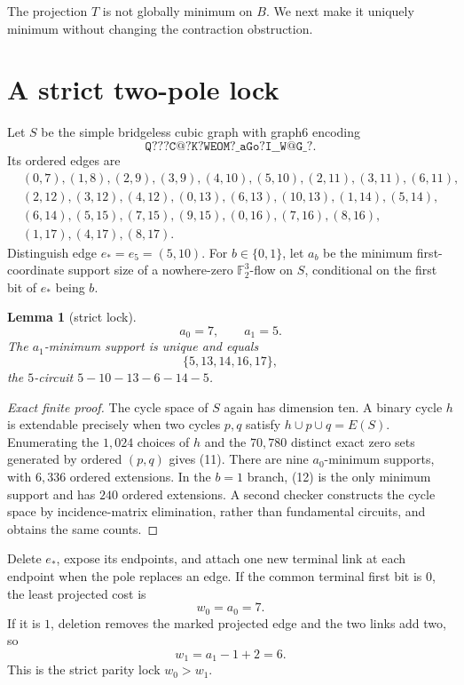 \documentclass[11pt]{article}
\newtheorem{lemma}[theorem]{Lemma}
\theoremstyle{definition}
\theoremstyle{remark}
\newcommand{\F}{\mathbb F}
\begin{document}
The projection \(T\) is not globally minimum on \(B\).  We next make it
uniquely minimum without changing the contraction obstruction.

\section{A strict two-pole lock}

Let \(S\) be the simple bridgeless cubic graph with graph6 encoding
\[
             \texttt{Q???C@?K?WEOM?\_aGo?I\_\_W@G\_?}.    \tag{9}
\]
Its ordered edges are
\[
\begin{split}
&(0,7),(1,8),(2,9),(3,9),(4,10),(5,10),(2,11),(3,11),(6,11),\\
&(2,12),(3,12),(4,12),(0,13),(6,13),(10,13),(1,14),(5,14),\\
&(6,14),(5,15),(7,15),(9,15),(0,16),(7,16),(8,16),\\
&(1,17),(4,17),(8,17).
\end{split}                                                \tag{10}
\]
Distinguish edge \(e_*=e_5=(5,10)\).  For \(b\in\{0,1\}\), let
\(a_b\) be the minimum first-coordinate support size of a nowhere-zero
\(\F_2^3\)-flow on \(S\), conditional on the first bit of \(e_*\)
being \(b\).

\begin{lemma}[strict lock]\label{lem:lock}
\[
                            a_0=7,\qquad a_1=5.            \tag{11}
\]
The \(a_1\)-minimum support is unique and equals
\[
                           \{5,13,14,16,17\},              \tag{12}
\]
the \(5\)-circuit \(5-10-13-6-14-5\).
\end{lemma}

\begin{proof}[Exact finite proof]
The cycle space of \(S\) again has dimension ten.  A binary cycle \(h\)
is extendable precisely when two cycles \(p,q\) satisfy
\(h\cup p\cup q=E(S)\).  Enumerating the \(1{,}024\) choices of \(h\)
and the \(70{,}780\) distinct exact zero sets generated by ordered
\((p,q)\) gives (11).  There are nine \(a_0\)-minimum supports, with
\(6{,}336\) ordered extensions.  In the \(b=1\) branch, (12) is the
only minimum support and has \(240\) ordered extensions.  A second
checker constructs the cycle space by incidence-matrix elimination,
rather than fundamental circuits, and obtains the same counts.
\end{proof}

Delete \(e_*\), expose its endpoints, and attach one new terminal link
at each endpoint when the pole replaces an edge.  If the common
terminal first bit is \(0\), the least projected cost is
\[
                              w_0=a_0=7.
\]
If it is \(1\), deletion removes the marked projected edge and the two
links add two, so
\[
                              w_1=a_1-1+2=6.               \tag{13}
\]
This is the strict parity lock \(w_0>w_1\).
\end{document}
